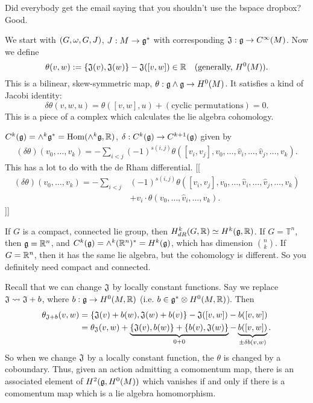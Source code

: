  \setcounter{lecture}{17}

 Did everybody get the email saying that you shouldn't use the bspace dropbox? Good.

 We start with $(G,\omega,G,J)$, $J:M\to \mathfrak{g}^*$ with corresponding $\mathfrak{J}:\mathfrak{g}\to C^\infty(M)$.
 Now we define
 \[
    \theta(v,w):=\{\mathfrak{J}(v),\mathfrak{J}(w)\}-\mathfrak{J}([v,w]) \in \mathbb{R} \quad (\text{generally, } H^0(M)).
 \]
 This is a bilinear, skew-symmetric map, $\theta: \mathfrak{g}\wedge\mathfrak{g}\to H^0(M)$.  It satisfies
 a kind of Jacobi identity:
 \[
    \delta\theta(v,w,u)=\theta([v,w],u)+(\text{cyclic permutations})=0.
 \]
 This is a piece of a complex which calculates the lie algebra cohomology.

 $C^k(\mathfrak{g})=\wedge^k\mathfrak{g}^*=\text{\rm Hom}(\wedge^k \mathfrak{g},\mathbb{R})$, $\delta: C^k(\mathfrak{g})\to C^{k+1}(\mathfrak{g})$ given
 by
 \begin{align*}
 (\delta\theta)(v_0,\dots,v_k)= - \sum_{i<j}(-1)^{s(i,j)}\theta([v_i,v_j],v_0,\dots, \hat
 v_i,\dots, \hat v_j,\dots ,v_k).
 \end{align*}
 This has a lot to do with the de Rham
 differential.
 [[\begin{align*}
 (\delta\theta)(v_0,\dots,v_k)= - \sum_{i<j}&(-1)^{s(i,j)}\theta([v_i,v_j],v_0,\dots, \hat
 v_i,\dots, \hat v_j,\dots ,v_k)\\
 &+v_i\cdot \theta(v_0,\dots, \hat v_i,\dots, v_k).
 \end{align*}]]

 If $G$ is a compact, connected lie group, then $H^k_{dR}(G,\mathbb{R})\simeq H^k(\mathfrak{g},\mathbb{R})$.  If
 $G=\mathbb{T}^n$, then $\mathfrak{g}=\mathbb{R}^n$, and $C^k(\mathfrak{g})=\wedge^k(\mathbb{R}^n)^*=H^k(\mathfrak{g})$, which has
 dimension $\binom{n}{k}$.
 If $G=\mathbb{R}^n$, then it has the same lie algebra, but the cohomology is different.  So
 you definitely need compact and connected.

 Recall that we can change $\mathfrak{J}$ by locally constant functions.  Say we replace
 $\mathfrak{J}\rightsquigarrow \mathfrak{J}+b$, where $b:\mathfrak{g}\to H^0(M,\mathbb{R})$ (i.e. $b\in \mathfrak{g}^*\otimes
 H^0(M,\mathbb{R})$).  Then
 \begin{align*}
  \theta_{\mathfrak{J}+b}(v,w) &= \{\mathfrak{J}(v)+b(w),\mathfrak{J}(w)+b(v)\}-\mathfrak{J}([v,w])-b([v,w])\\
  &= \theta_{\mathfrak{J}} (v,w) + \underbrace{\{\mathfrak{J}(v),b(w)\} + \{b(v),\mathfrak{J}(w)\}}_{0+0}- \underbrace{b([v,w])}_{\pm \delta b(v,w)}.
 \end{align*}
 So when we change $\mathfrak{J}$ by a locally constant function, the $\theta$ is changed by a
 coboundary.  Thus, given an action admitting a comomentum map, there is an associated
 element of $H^2(\mathfrak{g},H^0(M))$ which vanishes if and only if there is a comomentum map
 which is a lie algebra homomorphism.

